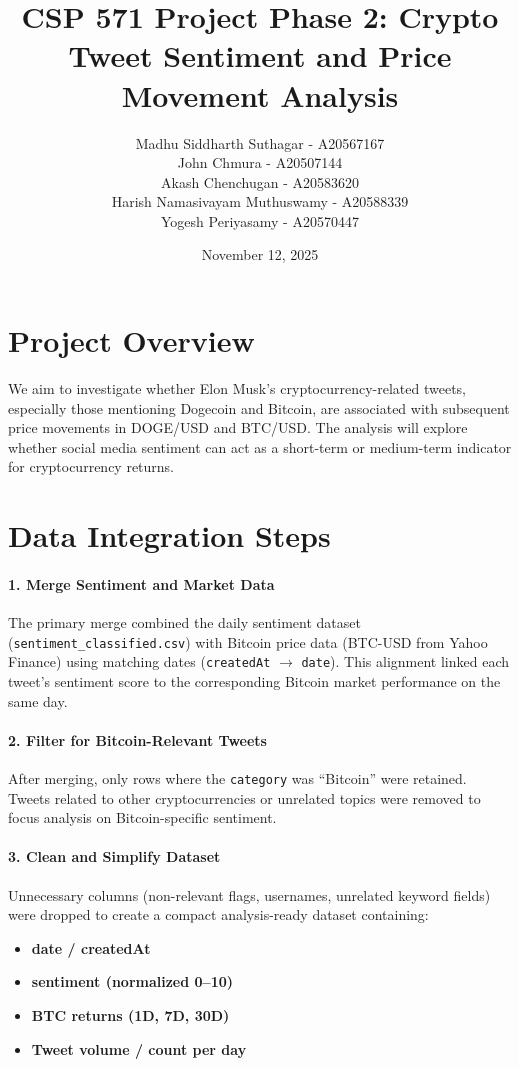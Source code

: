 \documentclass[12pt]{article}
\title{CSP 571 Project Phase 2: Crypto Tweet Sentiment and Price Movement Analysis}
\author{Madhu Siddharth Suthagar - A20567167 \\ John Chmura - A20507144 \\ Akash Chenchugan - A20583620 \\ Harish Namasivayam Muthuswamy - A20588339 \\ Yogesh Periyasamy - A20570447}
\date{November 12, 2025}
\begin{document}
\maketitle

\section{Project Overview}
We aim to investigate whether Elon Musk's cryptocurrency-related tweets, especially those mentioning Dogecoin and Bitcoin, are associated with subsequent price movements in DOGE/USD and BTC/USD. The analysis will explore whether social media sentiment can act as a short-term or medium-term indicator for cryptocurrency returns.

\section{Data Integration Steps}

\paragraph{1. Merge Sentiment and Market Data}
The primary merge combined the daily sentiment dataset (\texttt{sentiment\_classified.csv}) with Bitcoin price data (BTC-USD from Yahoo Finance) using matching dates (\texttt{createdAt} $\rightarrow$ \texttt{date}). This alignment linked each tweet’s sentiment score to the corresponding Bitcoin market performance on the same day.

\paragraph{2. Filter for Bitcoin-Relevant Tweets}
After merging, only rows where the \texttt{category} was ``Bitcoin'' were retained. Tweets related to other cryptocurrencies or unrelated topics were removed to focus analysis on Bitcoin-specific sentiment.

\paragraph{3. Clean and Simplify Dataset}
Unnecessary columns (non-relevant flags, usernames, unrelated keyword fields) were dropped to create a compact analysis-ready dataset containing:
\begin{itemize}
    \item \textbf{date / createdAt}
    \item \textbf{sentiment (normalized 0--10)}
    \item \textbf{BTC returns (1D, 7D, 30D)}
    \item \textbf{Tweet volume / count per day}
\end{itemize}
\end{document}
